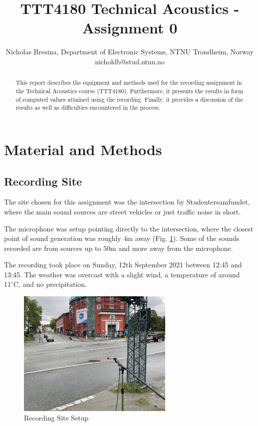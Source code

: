 \documentclass[twocolumn]{article}
\begin{document}
\title{TTT4180 Technical Acoustics - Assignment 0}

\author{Nicholas Bresina, Department of Electronic Systems, NTNU Trondheim, Norway \\
nicholdb@stud.ntnu.no}

\maketitle\thispagestyle{empty}

\begin{abstract}
This report describes the equipment and methods used for the recording assignment in the Technical
Acoustics course (TTT4180).
Furthermore, it presents the results in form of computed values attained using the recording.
Finally, it provides a discussion of the results as well as difficulties encountered in the process.
\end{abstract}

\section{Material and Methods}
\subsection{Recording Site}
The site chosen for this assignment was the intersection by Studentersamfundet, where the main sound sources
are street vehicles or just traffic noise in short.

The microphone was setup pointing directly to the intersection, where the closest point of sound generation
was roughly $4\textrm{m}$ away (Fig. \ref{fig:recording_site_setup}).
Some of the sounds recorded are from sources up to $50\textrm{m}$ and more away from the microphone.

The recording took place on Sunday, 12th September 2021 between 12:45 and 13:45.
The weather was overcast with a slight wind, a temperature of around $11^\circ\textrm{C}$,
and no precipitation.

\begin{figure}[H]
    \centering
    \includegraphics[width=75mm]{./Images/samfundet_recording_site.jpg}
    \caption{Recording Site Setup}
    \label{fig:recording_site_setup}
\end{figure}
\end{document}
